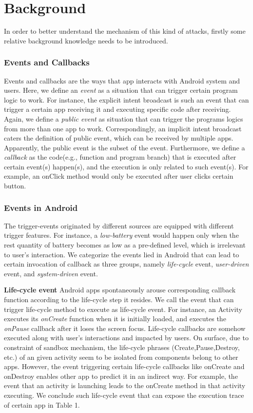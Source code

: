 \documentclass{sig-alternate-05-2015}
\begin{document}
\section{Background}
In order to better understand the mechanism of this kind of attacks, firstly some relative background knowledge needs to be introduced.

\subsubsection{Events and Callbacks}
Events and callbacks are the ways that app interacts with Android system and users. Here, we define an \textit{event} as a situation that can trigger certain program logic to work. For instance, the explicit intent broadcast is such an event that can trigger a certain app receiving it and executing specific code after receiving.
Again, we define a \textit{public event} as situation that can trigger the programs logics from more than one app to work. Correspondingly, an implicit intent broadcast caters the definition of public event, which can be received by multiple apps. Apparently, the public event is the subset of the event.
Furthermore, we define a \textit{callback} as the code(e.g., function and program branch) that is executed after certain event(s) happen(s), and the execution is only related to such event(s). For example, an onClick method would only be executed after user clicks certain button. 

\subsubsection{Events in Android}
The trigger-events originated by different sources are equipped with different trigger features. For instance, a \textit{low-battery} event would happen only when the rest quantity of battery becomes as low as a pre-defined level, which is irrelevant to user's interaction. We categorize the events lied in Android that can lead to certain invocation of callback as three groups, namely \textit{life-cycle} event, \textit{user-driven} event, and \textit{system-driven} event.

\textbf{Life-cycle event} Android apps spontaneously arouse corresponding callback function according to the life-cycle step it resides. We call the event that can trigger life-cycle method to execute as life-cycle event. For instance, an Activity executes its \textit{onCreate} function when it is initially loaded, and executes the \textit{onPause} callback after it loses the screen focus. Life-cycle callbacks are somehow executed along with user's interactions and impacted by users. On surface, due to constraint of sandbox mechanism, the life-cycle phrases (Create,Pause,Destroy, etc.) of an given activity seem to be isolated from components belong to other apps. However, the event triggering certain life-cycle callbacks like onCreate and onDestroy enables other app to predict it in an indirect way. For example, the event that an activity is launching leads to the onCreate method in that activity executing. We conclude such life-cycle event that can expose the execution trace of certain app in Table 1.
\end{document}
